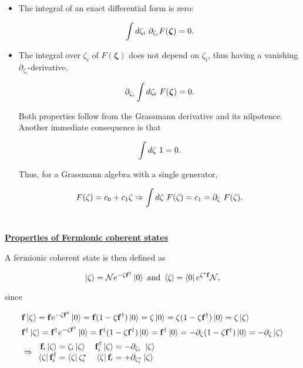 \documentclass{homework}
\begin{document}
\begin{itemize}
    \begin{itemize}
        \item The integral of an exact differential form is zero:
        
        $$
            \int d\zeta_i \textnormal{ } \partial_{\zeta_i} F(\bm{\zeta}) = 0.
        $$
        
        \item The integral over $\zeta_i$ of $F(\bm{\zeta})$ does not depend on $\zeta_i$, thus having a vanishing $\partial_{\zeta_i}$-derivative,
        
        $$
            \partial_{\zeta_i} \int d\zeta_i \textnormal{ } F(\bm{\zeta}) = 0.
        $$
        
        Both properties follow from the Grassmann derivative and its nilpotence. Another immediate consequence is that 
        
        $$
        \int d\zeta \textnormal{ } 1 = 0. 
        $$
        
        Thus, for a Grassmann algebra with a single generator, 
        
        \begin{equation}
            F(\zeta) = c_0 + c_1 \zeta \Rightarrow \int d\zeta \textnormal{ } F(\zeta) = c_1 = \partial_{\zeta} \textnormal{ } F(\zeta).
        \end{equation}
        \blanky \\
    \end{itemize}
\end{itemize}

\textbf{\underline{Properties of Fermionic coherent states}}

A fermionic coherent state is then defined as

$$
    \ket{\zeta} = \mathcal{N} e^{-\zeta {\bf f}^\dagger} \ket{0} \textnormal{ and } 
    \bra{\zeta} = \bra{0} e^{\zeta^\star {{\bf f}}} \mathcal{N},
$$

since 

\begin{equation*}\begin{split}
    &{\bf f} \ket{\zeta} = {\bf f} e^{-\zeta {{\bf f}}^\dagger} \ket{0} = {\bf f} (1- \zeta {\bf f}^\dagger) \ket{0} = \zeta \ket{0} = \zeta (1-\zeta {\bf f}^\dagger) \ket{0} = \zeta \ket{\zeta} \\
    &{\bf f}^\dagger \ket{\zeta} = {\bf f}^\dagger e^{-\zeta {{\bf f}}^\dagger} \ket{0} = {\bf f}^\dagger (1- \zeta {\bf f}^\dagger) \ket{0} = {\bf f}^\dagger \ket{0} = - \partial_{\zeta} (1-\zeta {\bf f}^\dagger) \ket{0} = - \partial_{\zeta} \ket{\zeta} \\
&\Rightarrow \begin{array}{cc}
    {{\bf f}}_{i} \ket{\zeta} = \zeta_i \ket{\zeta} & {{\bf f}}_{i}^\dagger \ket{\zeta} = - \partial_{\zeta_i} \textnormal{ } \ket{\zeta}  \\
    \bra{\zeta} {{\bf f}}_{i}^\dagger = \bra{\zeta} \zeta_i^\star & \bra{\zeta} {{\bf f}}_{i} = + \partial_{\zeta_i^\star} \ket{\zeta} 
\end{array}    
\end{split}\end{equation*}
\end{document}
